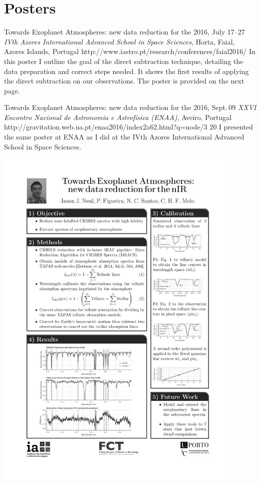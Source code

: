 \section{Posters}\label{appsec:posters}

 {Towards Exoplanet Atmospheres: new data reduction for the \nir{}}%
{2016, July 17--27}%
{\textit{IVth Azores International Advanced School in Space Sciences}, Horta, Faial, Azores Islands, Portugal}%
{http://www.iastro.pt/research/conferences/faial2016/}%
{}%
{In this poster I outline the goal of the direct subtraction technique, detailing the data preparation and correct steps needed.
    It shows the first results of applying the direct subtraction on our observations.
    The poster is provided on the next page.}%


 {Towards Exoplanet Atmospheres: new data reduction for the \nir{}}%
{2016, Sept.\,09}%
{\textit{XXVI Encontro Nacional de Astronomia e Astrofísica (ENAA)}, Aveiro, Portugal}%
{ http://gravitation.web.ua.pt/enaa2016/index2a62.html?q=node/3}%
{20}%
{I presented the same poster at ENAA as I did at the IVth Azores International Advanced School in Space Sciences.}


{\centering \includegraphics[width=0.9\textwidth, keepaspectratio=true, page = 1, trim = 1.5cm 1cm 1.5cm 1cm, clip = true]{appendices/papers/Azores2016_grey}}
